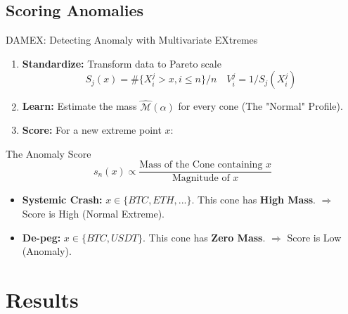 \documentclass{beamer}
\begin{document}
\subsection{Scoring Anomalies}
\begin{frame}{DAMEX: Detecting Anomaly with Multivariate EXtremes}
    \begin{enumerate}
        \item \textbf{Standardize:} Transform data to Pareto scale $$S_j(x) = \#\{X_i^j>x, i \leq n\}/n \quad V_i^j = 1/S_j(X_i^j)$$
        \item \textbf{Learn:} Estimate the mass $\hat{\mathcal{M}}(\alpha)$ for every cone (The "Normal" Profile).
        \item \textbf{Score:} For a new extreme point $x$:
    \end{enumerate}
    \vspace{-0.2cm}
    \begin{block}{The Anomaly Score}
        $$ s_n(x) \propto \frac{\text{Mass of the Cone containing } x}{\text{Magnitude of } x} $$
    \end{block}

    \begin{itemize}
        \item \textbf{Systemic Crash:} $x \in \{BTC, ETH, ...\}$. This cone has \textbf{High Mass}.
        $\Rightarrow$ Score is High (Normal Extreme).
        \item \textbf{De-peg:} $x \in \{BTC, USDT\}$. This cone has \textbf{Zero Mass}.
        $\Rightarrow$ Score is Low (Anomaly).
    \end{itemize}
\end{frame}

\section{Results}
\end{document}
